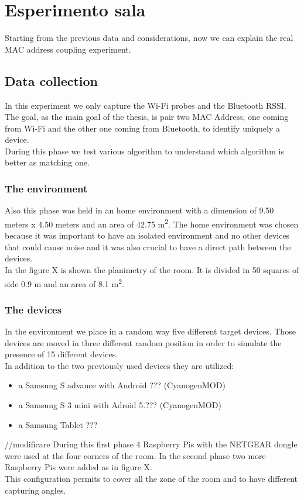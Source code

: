 \section{Esperimento sala}
Starting from the previous data and considerations, now we can explain the real MAC address coupling experiment.\\
\subsection{Data collection}
In this experiment we only capture the Wi-Fi probes and the Bluetooth RSSI.
The goal, as the main goal of the thesis, is pair two MAC Address, one coming from Wi-Fi and the other one coming from Bluetooth, to identify uniquely a device.\\
During this phase we test various algorithm to understand which algorithm is better as matching one.
\subsubsection{The environment}
Also this phase was held in an home environment with a dimension of 9.50 meters x 4.50 meters and an area of 42.75 m\textsuperscript{2}.
The home environment was chosen because it was important to have an isolated environment and no other devices that could cause noise and it was also crucial to have a direct path between the  devices.\\
In the figure X is shown the planimetry of the room. It is divided in 50 squares of side 0.9 m and an area of 8.1 m\textsuperscript{2}.
\subsubsection{The devices}
In the environment we place in a random way five different target devices. Those devices are moved in three different random position in order to simulate the presence of 15 different devices.\\
In addition to the two previously used devices they are utilized:
\begin{itemize}
\item a Samsung S advance with Android ??? (CyanogenMOD)
\item a Samsung S 3 mini with Adroid 5.??? (CyanogenMOD)
\item a Samsung Tablet ???
\end{itemize}
//modificare
During this first phase 4 Raspberry Pis with the NETGEAR dongle were used at the four corners of the room. In the second phase two more Raspberry Pis were added as in figure X. \\
This configuration permits to cover all the zone of the room and to have different capturing angles.
